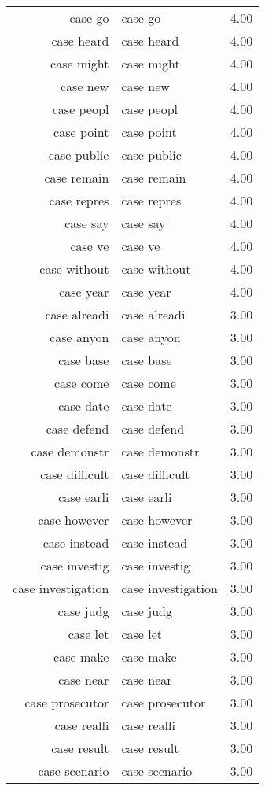 \begin{table}[ht]
\begin{tabular}{rlr}
  case go & case go & 4.00 \\ 
  case heard & case heard & 4.00 \\ 
  case might & case might & 4.00 \\ 
  case new & case new & 4.00 \\ 
  case peopl & case peopl & 4.00 \\ 
  case point & case point & 4.00 \\ 
  case public & case public & 4.00 \\ 
  case remain & case remain & 4.00 \\ 
  case repres & case repres & 4.00 \\ 
  case say & case say & 4.00 \\ 
  case ve & case ve & 4.00 \\ 
  case without & case without & 4.00 \\ 
  case year & case year & 4.00 \\ 
  case alreadi & case alreadi & 3.00 \\ 
  case anyon & case anyon & 3.00 \\ 
  case base & case base & 3.00 \\ 
  case come & case come & 3.00 \\ 
  case date & case date & 3.00 \\ 
  case defend & case defend & 3.00 \\ 
  case demonstr & case demonstr & 3.00 \\ 
  case difficult & case difficult & 3.00 \\ 
  case earli & case earli & 3.00 \\ 
  case however & case however & 3.00 \\ 
  case instead & case instead & 3.00 \\ 
  case investig & case investig & 3.00 \\ 
  case investigation & case investigation & 3.00 \\ 
  case judg & case judg & 3.00 \\ 
  case let & case let & 3.00 \\ 
  case make & case make & 3.00 \\ 
  case near & case near & 3.00 \\ 
  case prosecutor & case prosecutor & 3.00 \\ 
  case realli & case realli & 3.00 \\ 
  case result & case result & 3.00 \\ 
  case scenario & case scenario & 3.00 \\ 

\end{tabular}
\end{table}
